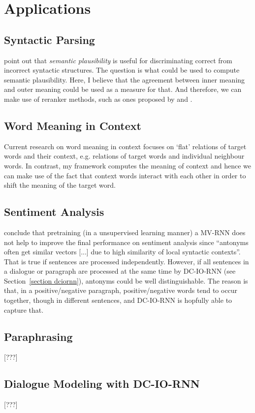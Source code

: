 \documentclass[10pt]{article}
\begin{document}
\section{Applications}
\label{section applications}

\subsection{Syntactic Parsing}
\cite{lazaridou2013fish} point out that \textit{semantic plausibility} is useful for discriminating 
correct from incorrect syntactic structures. The question is what could be used to compute 
semantic plausibility. Here, I believe that the agreement between inner meaning and outer meaning
could be used as a measure for that. And therefore, we can make use of reranker methods, 
such as ones proposed by \cite{socher2013parsing} and \cite{le2013learning}.

\subsection{Word Meaning in Context}
Current research on word meaning in context \citep{huang2012improving,
thater2011word, dinu2010measuring, erk2008structured, dinu2012comparison}
focuses on `flat' relations of  target words
and their context, e.g. relations of target words and individual neighbour words. 
In contrast, my framework computes the meaning of context and hence we can 
make use of the fact that context words interact with each other in order to shift the 
meaning of the target word.

\subsection{Sentiment Analysis}
\cite{socher2012semantic} conclude that pretraining (in a unsupervised learning manner)
a MV-RNN does not help to improve the final performance on sentiment analysis 
since ``antonyms often get similar vectors [...] due to high similarity of 
local syntactic contexts''. That is true if sentences are processed independently. 
However, if all sentences in a dialogue or paragraph are processed at the same time
by DC-IO-RNN (see Section~\ref{section dciornn}), antonyms could be well 
distinguishable. The reason is that, in a positive/negative paragraph, positive/negative words tend
to occur together, though in different sentences, and DC-IO-RNN is hopfully able to capture that.

\subsection{Paraphrasing}
[???]

\subsection{Dialogue Modeling with DC-IO-RNN}
[???]





\end{document}
